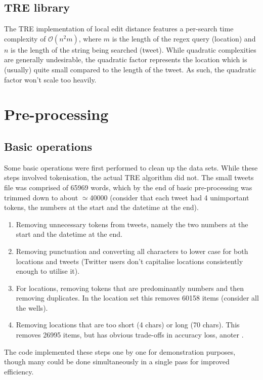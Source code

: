 \documentclass[twocolumn]{article}
\begin{document}
\subsection{TRE library}
The TRE implementation of local edit distance features a per-search time complexity of $\mathcal{O}(n^2{}m)$, where $m$ is the length of the regex query (location) and $n$ is the length of the string being searched (tweet). While quadratic complexities are generally undesirable, the quadratic factor represents the location which is (usually) quite small compared to the length of the tweet. As such, the quadratic factor won't scale too heavily.

\section{Pre-processing}
\subsection{Basic operations}

Some basic operations were first performed to clean up the data sets. While these steps involved tokenisation, the actual TRE algorithm did not. The small tweets file was comprised of 65969 words, which by the end of basic pre-processing was trimmed down to about $\simeq$40000 (consider that each tweet had 4 unimportant tokens, the numbers at the start and the datetime at the end).

\begin{enumerate}
\item Removing unnecessary tokens from tweets, namely the two numbers at the start and the datetime at the end.
\item Removing punctuation and converting all characters to lower case for both locations and tweets (Twitter users don't capitalise locations consistently enough to utilise it).
\item For locations, removing tokens that are predominantly numbers and then removing duplicates. In the location set this removes 60158 items (consider all the wells).
\item Removing locations that are too short (4 chars) or long (70 chars). This removes 26995 items, but has obvious trade-offs in accuracy loss, anoter .
\end{enumerate}

The code implemented these steps one by one for demonstration purposes, though many could be done simultaneously in a single pass for improved efficiency.
\end{document}
